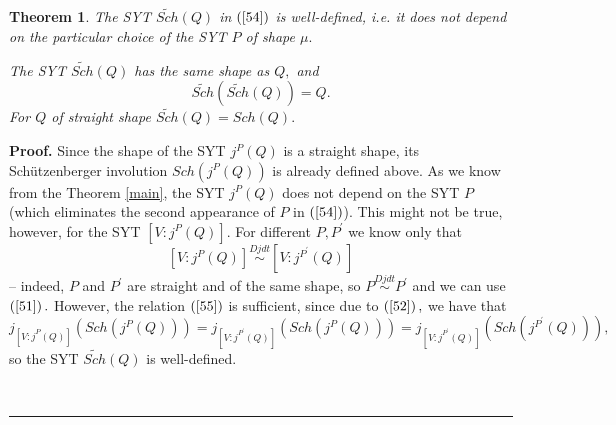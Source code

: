 \documentclass[12pt]{article}%
\newtheorem{theorem}{Theorem}
\newenvironment{proof}[1][Proof]{\noindent\textbf{#1.} }{\ \rule{0.5em}{0.5em}}
\begin{document}
\begin{theorem}
The SYT $\widetilde{Sch}\left(  Q\right)  $ in $\left(  \ref{54}\right)  $ is
well-defined, i.e. it does not depend on the particular choice of the SYT $P$
of shape $\mu.$

The SYT $\widetilde{Sch}\left(  Q\right)  $ has the same shape as $Q,$ and%
\[
\widetilde{Sch}\left(  \widetilde{Sch}\left(  Q\right)  \right)  =Q.
\]
For $Q$ of straight shape $\widetilde{Sch}\left(  Q\right)  =Sch\left(
Q\right)  .$
\end{theorem}

\begin{proof}
Since the shape of the SYT $j^{P}\left(  Q\right)  $ is a straight shape, its
Sch\"{u}tzenberger involution $Sch\left(  j^{P}\left(  Q\right)  \right)  $ is
already defined above. As we know from the Theorem \ref{main}, the SYT
$j^{P}\left(  Q\right)  $ does not depend on the SYT $P$ (which eliminates the
second appearance of $P$ in $\left(  \ref{54}\right)  $). This might not be
true, however, for the SYT $\left[  V:j^{P}\left(  Q\right)  \right]  .$ For
different $P,P^{\prime}$ we know only that
\begin{equation}
\left[  V:j^{P}\left(  Q\right)  \right]  \overset{Djdt}{\sim}\left[
V:j^{P^{\prime}}\left(  Q\right)  \right]  \label{55}%
\end{equation}
-- indeed, $P$ and $P^{\prime}$ are straight and of the same shape, so
$P\overset{Djdt}{\sim}P^{\prime}$ and we can use $\left(  \ref{51}\right)  .$
However, the relation $\left(  \ref{55}\right)  $ is sufficient, since due to
$\left(  \ref{52}\right)  ,$ we have that
\[
j_{\left[  V:j^{P}\left(  Q\right)  \right]  }\left(  Sch\left(  j^{P}\left(
Q\right)  \right)  \right)  =j_{\left[  V:j^{P^{\prime}}\left(  Q\right)
\right]  }\left(  Sch\left(  j^{P}\left(  Q\right)  \right)  \right)
=j_{\left[  V:j^{P^{\prime}}\left(  Q\right)  \right]  }\left(  Sch\left(
j^{P^{\prime}}\left(  Q\right)  \right)  \right)  ,
\]
so the SYT $\widetilde{Sch}\left(  Q\right)  $ is well-defined.


\end{proof}
\end{document}
